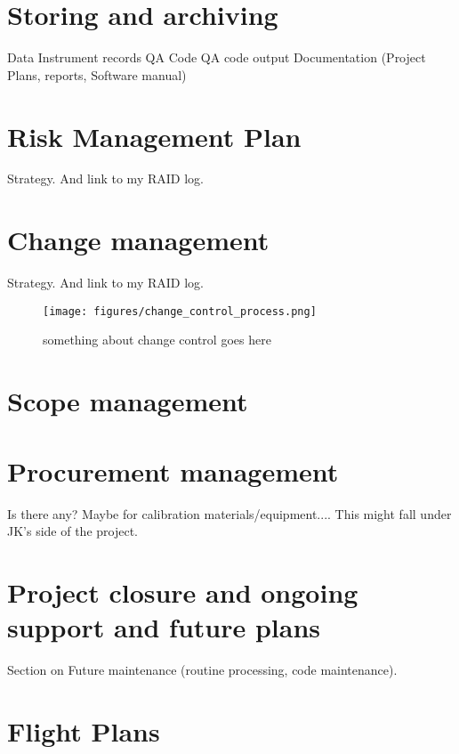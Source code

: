 \documentclass[11pt]{article} %
\begin{document}
\section{Storing and archiving}
Data
Instrument records
QA Code
QA code output
Documentation (Project Plans, reports, Software manual) 

\newpage
\section{Risk Management Plan}

Strategy. And link to my RAID log.

\newpage
\section{Change management}

Strategy. And link to my RAID log.

\begin{figure}[!h]
    \caption{something about change control goes here}
    \centering
    \texttt{[image: figures/change\_control\_process.png]}
    \label{fig:changecontrol}
\end{figure}


\newpage
\section{Scope management}

\newpage
\section{Procurement management}
Is there any? Maybe for calibration materials/equipment.... This might fall under JK's side of the project.

\newpage
\section{Project closure and ongoing support and future plans}
Section on Future maintenance (routine processing, code maintenance).
\pagebreak

\newpage
\section{Flight Plans}
\end{document}
